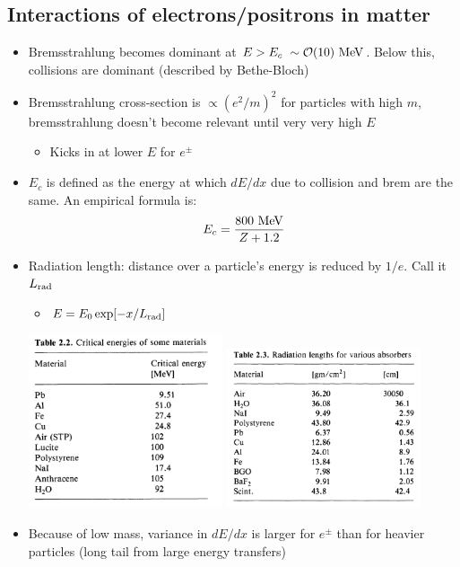 \subsection{Interactions of electrons/positrons in matter}
\begin{itemize}
  \item Bremsstrahlung becomes dominant at $E>E_c~\sim\mathcal{O}(10)~\text{MeV}$. Below this, collisions are dominant (described by Bethe-Bloch)
  \item Bremsstrahlung cross-section is $\propto (e^2/m)^2$ \thus for particles with high $m$, bremsstrahlung doesn't become relevant until very very high $E$
  \begin{itemize}
    \item Kicks in at lower $E$ for $e^\pm$
  \end{itemize}
  \item $E_c$ is defined as the energy at which $dE/dx$ due to collision and brem are the same. An empirical formula is:
  \begin{equation}
    E_c = \frac{800~\text{MeV}}{Z+1.2}
  \end{equation}
  \item Radiation length: distance over a particle's energy is reduced by $1/e$. Call it $L_\text{rad}$
  \begin{itemize}
    \item $E=E_0 \exp[-x/L_\text{rad}]$
  \end{itemize}
  \begin{center}
    \includegraphics[width=0.45\textwidth]{figs/ecrit_table.png}
    \includegraphics[width=0.45\textwidth]{figs/radlength_table.png}
  \end{center}
  \item Because of low mass, variance in $dE/dx$ is larger for $e^\pm$ than for heavier particles (long tail from large energy transfers)
\end{itemize}


